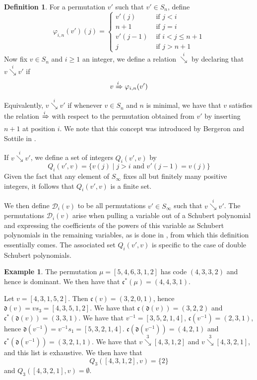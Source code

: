 \documentclass{amsart}
\theoremstyle{definition}
\newtheorem{definition}[lemma]{Definition}
\newtheorem{example}[lemma]{Example}
\theoremstyle{remark}
\numberwithin{equation}{subsection}
\newcommand{\Tom}[1]{\xRightarrow{#1}}
\newcommand{\downvar}[1]{\stackrel{#1}{\searrow}}
\newcommand{\dom}{\mathfrak{d}}
\newcommand{\code}{\mathfrak{c}}
\begin{document}
	
	
	
	
	
	\begin{definition}\label{definition:polysequence}
		For a permutation $v'$ such that $v'\in S_{n}$, define
		$$\varphi_{i,n}(v')(j)=\begin{cases}
			v'(j)&\mbox{ if }j<i\\
			n+1&\mbox{ if }j=i\\
			v'(j-1)&\mbox{ if }i<j\leq n+1\\
			j&\mbox{ if }j>n+1
		\end{cases}$$
		Now fix $v\in S_n$ and $i\geq 1$ an integer, we define a relation $\downvar{i}$ by declaring that $v\downvar{i} v'$ if 
		$$v\Tom{i}\varphi_{i,n}(v')$$
		Equivalently, $v\downvar{i} v'$ if whenever $v\in S_n$ and $n$ is minimal, we have that $v$ satisfies the relation $\Tom{i}$ with respect to the permutation obtained from $v'$ by inserting $n+1$ at position $i$. We note that this concept was introduced by Bergeron and Sottile in \cite{bsskew}.
		
		If $v\downvar{i} v'$, we define a set of integers $Q_i(v',v)$ by
		$$Q_i(v',v)=\{v(j)\mid j>i\mbox{ and }v'(j-1)=v(j)\}$$
		Given the fact that any element of $S_\infty$ fixes all but finitely many positive integers, it follows that $Q_i(v',v)$ is a finite set.
		
		We then define $\mathcal{D}_i(v)$ to be all permutations $v'\in S_\infty$ such that $v\downvar{i} v'$. The permutations $\mathcal{D}_i(v)$ arise when pulling a variable out of a Schubert polynomial and expressing the coefficients of the powers of this variable as Schubert polynomials in the remaining variables, as is done in \cite{coprod}, from which this definition essentially comes. The associated set $Q_i(v',v)$ is specific to the case of double Schubert polynomials.
	\end{definition}
	
	
	
	\begin{example} 
		The permutation $\mu=[5,4,6,3,1,2]$ has code $(4,3,3,2)$ and hence is dominant. We then have that $\code^*(\mu)=(4,4,3,1)$.
		
		Let $v=[4,3,1,5,2]$. Then $\code(v)=(3,2,0,1)$, hence $\dom(v)=vs_3=[4,3,5,1,2]$. We have that $\code(\dom(v))=(3,2,2)$ and $\code^*(\dom(v))=(3,3,1)$. We have that $v^{-1}=[3,5,2,1,4]$, $\code(v^{-1})=(2,3,1)$, hence $\dom(v^{-1})=v^{-1}s_1=[5,3,2,1,4]$. $\code(\dom(v^{-1}))=(4,2,1)$ and $\code^*(\dom(v^{-1}))=(3,2,1,1)$. We have that $v\downvar{3}[4,3,1,2]$ and $v\downvar{3}[4,3,2,1]$, and this list is exhaustive.
		We then have that
		$$Q_3([4,3,1,2],v)=\{2\}$$
		and $Q_3([4,3,2,1],v)=\emptyset$.
	\end{example}
	
\end{document}
